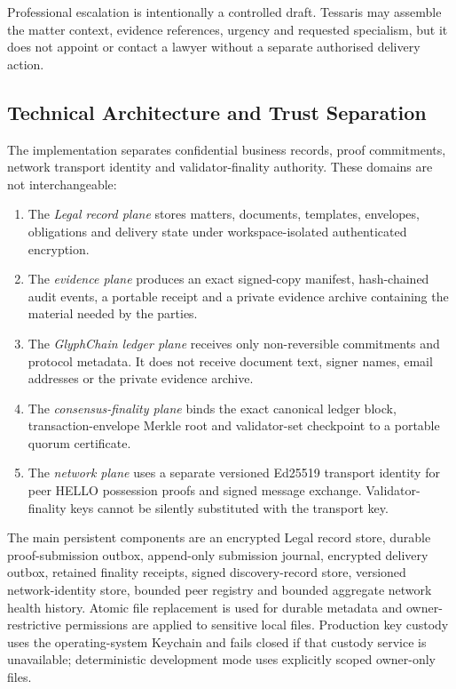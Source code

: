 Professional escalation is intentionally a controlled draft. Tessaris may
assemble the matter context, evidence references, urgency and requested
specialism, but it does not appoint or contact a lawyer without a separate
authorised delivery action.

\subsection{Technical Architecture and Trust Separation}

The implementation separates confidential business records, proof commitments,
network transport identity and validator-finality authority. These domains are
not interchangeable:

\begin{enumerate}
  \item The \emph{Legal record plane} stores matters, documents, templates,
        envelopes, obligations and delivery state under workspace-isolated
        authenticated encryption.
  \item The \emph{evidence plane} produces an exact signed-copy manifest,
        hash-chained audit events, a portable receipt and a private evidence
        archive containing the material needed by the parties.
  \item The \emph{GlyphChain ledger plane} receives only non-reversible
        commitments and protocol metadata. It does not receive document text,
        signer names, email addresses or the private evidence archive.
  \item The \emph{consensus-finality plane} binds the exact canonical ledger
        block, transaction-envelope Merkle root and validator-set checkpoint to
        a portable quorum certificate.
  \item The \emph{network plane} uses a separate versioned Ed25519 transport
        identity for peer HELLO possession proofs and signed message exchange.
        Validator-finality keys cannot be silently substituted with the
        transport key.
\end{enumerate}

The main persistent components are an encrypted Legal record store, durable
proof-submission outbox, append-only submission journal, encrypted delivery
outbox, retained finality receipts, signed discovery-record store, versioned
network-identity store, bounded peer registry and bounded aggregate network
health history. Atomic file replacement is used for durable metadata and
owner-restrictive permissions are applied to sensitive local files. Production
key custody uses the operating-system Keychain and fails closed if that custody
service is unavailable; deterministic development mode uses explicitly scoped
owner-only files.

